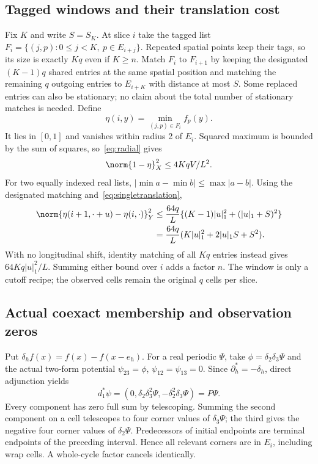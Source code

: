 \subsection{Tagged windows and their translation cost}
Fix $K$ and write $S=S_K$. At slice $i$ take the tagged list
$F_i=\{(j,p):0\leq j<K,\ p\in E_{i+j}\}$. Repeated spatial points keep
their tags, so its size is exactly $Kq$ even if $K\geq n$.
Match $F_i$ to $F_{i+1}$ by keeping the designated $(K-1)q$ shared entries
at the same spatial position and matching the remaining $q$ outgoing
entries to $E_{i+K}$ with distance at most $S$. Some replaced entries can
also be stationary; no claim about the total number of stationary matches
is needed. Define
\[
 \eta(i,y)=\min_{(j,p)\in F_i} f_p(y).
\]
It lies in $[0,1]$ and vanishes within radius 2 of $E_i$. Squared maximum
is bounded by the sum of squares, so~\eqref{eq:radial} gives
\begin{equation}\label{eq:etadeficit}
 \norm{1-\eta}_X^2\leq 4KqV/L^2.
\end{equation}
For two equally indexed real lists, $|\min a-\min b|\leq\max|a-b|$.
Using the designated matching and~\eqref{eq:singletranslation},
\begin{align}\label{eq:movingtranslation}
 \norm{\eta(i+1,\cdot+u)-\eta(i,\cdot)}_Y^2
 &\leq\frac{64q}{L}\{(K-1)|u|_1^2+(|u|_1+S)^2\}\notag\\
 &=\frac{64q}{L}(K|u|_1^2+2|u|_1S+S^2).
\end{align}
With no longitudinal shift, identity matching of all $Kq$ entries instead
gives $64Kq|u|_1^2/L$. Summing either bound over $i$ adds a factor $n$.
The window is only a cutoff recipe; the observed cells remain the original
$q$ cells per slice.

\subsection{Actual coexact membership and observation zeros}
Put $\delta_h f(x)=f(x)-f(x-e_h)$. For a real periodic $\Psi$, take
$\phi=\delta_2\delta_3\Psi$ and the actual two-form potential
$\psi_{23}=\phi$, $\psi_{12}=\psi_{13}=0$. Since
$\partial_h^*=-\delta_h$, direct adjunction yields
\[
 d_1^*\psi=(0,\delta_2\delta_3^2\Psi,-\delta_2^2\delta_3\Psi)=P\Psi.
\]
Every component has zero full sum by telescoping. Summing the second
component on a cell telescopes to four corner values of $\delta_3\Psi$;
the third gives the negative four corner values of $\delta_2\Psi$.
Predecessors of initial endpoints are terminal endpoints of the preceding
interval. Hence all relevant corners are in $E_i$, including wrap cells.
A whole-cycle factor cancels identically.

